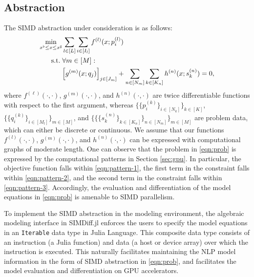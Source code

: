 \subsection{Abstraction}
The SIMD abstraction under consideration is as follows:
\begin{align}\label{eqn:prob}
  \min_{x^\flat\leq x \leq x^\sharp}
  & \sum_{l\in[L]}\sum_{i\in [I_l]} f^{(l)}(x; p^{(l)}_i)\\\nonumber
  \mathop{\text{\normalfont s.t.}}\; &\forall m\in[M]:\\\nonumber
  &\begin{aligned}[t]
    \left[g^{(m)}(x; q_j)\right]_{j\in [J_m]} +\sum_{n\in [N_m]}\sum_{k\in [K_n]}h^{(n)}(x; s^{(n)}_{k}) =0,
  \end{aligned}
  \end{align}
where $f^{(\ell)}(\cdot,\cdot)$, $g^{(m)}(\cdot,\cdot)$, and
$h^{(n)}(\cdot,\cdot)$ are twice differentiable functions with respect
to the first argument, whereas $\{\{p^{(k)}_i\}_{i\in [N_k]}\}_{k\in[K]}$,
$\{\{q^{(k)}_{i}\}_{i\in [M_l]}\}_{m\in[M]}$, and
$\{\{\{s^{(n)}_{k}\}_{k\in[K_n]}\}_{n\in[N_m]}\}_{m\in[M]}$ are
problem data, which can either be discrete or continuous.  We assume
that our functions $f^{(l)}(\cdot,\cdot)$, $g^{(m)}(\cdot,\cdot)$, and
$h^{(n)}(\cdot,\cdot)$ can be expressed with computational
graphs of moderate length. One can observe that the problem in
\eqref{eqn:prob} is expressed by the computational patterns in Section
\ref{sec:gpu}. In particular, the objective function falls within \ref{eqn:pattern-1},
the first term in the constraint falls within \ref{eqn:pattern-2}, and the second term in the constraint falls within \ref{eqn:pattern-3}.
Accordingly, the evaluation and differentiation of the
model equations in \eqref{eqn:prob} is amenable to SIMD parallelism.

To implement the SIMD abstraction in the modeling environment, the
algebraic modeling interface in SIMDiff.jl enforces the users to
specify the model equations in an {\tt Iterable} data type in
Julia Language. This composite data type consists of an instruction (a Julia
function) and data (a host or device array) over which the instruction
is executed. This naturally facilitates maintaining the NLP model
information in the form of SIMD abstraction in \eqref{eqn:prob}, and
facilitates the model evaluation and differentiation on GPU
accelerators.

